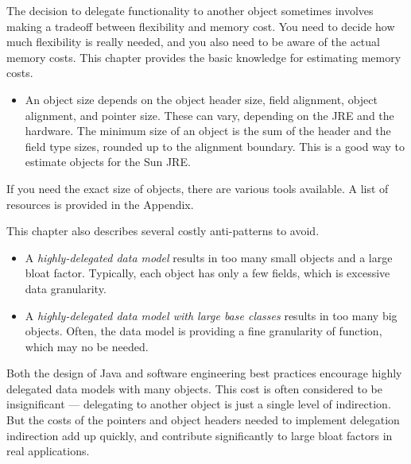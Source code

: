 The decision to delegate functionality to another object sometimes involves making a tradeoff between flexibility and memory cost. You need to decide how much flexibility is really needed, and you also need to be aware of the actual memory costs. This chapter provides the basic knowledge for estimating memory costs. 
\begin{itemize}
\item An object size depends on the object header size, field alignment, object alignment, and pointer size. These can vary, depending on the JRE and the hardware. The minimum size of an object is the sum of the header and the field type sizes, rounded up to the alignment boundary. This is a good way to estimate objects for the Sun JRE.
\end{itemize}
If you need the exact size of objects, there are various tools available. A list of resources is provided in the Appendix.

This chapter also describes several costly anti-patterns to avoid.
\begin{itemize}
\item A \textit{highly-delegated data model} results in too many small objects and a large bloat factor. Typically, each object has only a few fields, which is excessive data granularity.  
\item A \textit{highly-delegated data model with large base classes} results in too many big objects. Often, the data model is providing a fine granularity of function, which may no be needed.
\end{itemize}   

Both the design of Java and software engineering best practices encourage highly delegated data models with many objects. This cost is often considered to be insignificant --- delegating to another object is just a single level of indirection. But the costs of the pointers and object headers needed to implement delegation indirection add up quickly, and contribute significantly to large bloat factors in real applications. 

  

